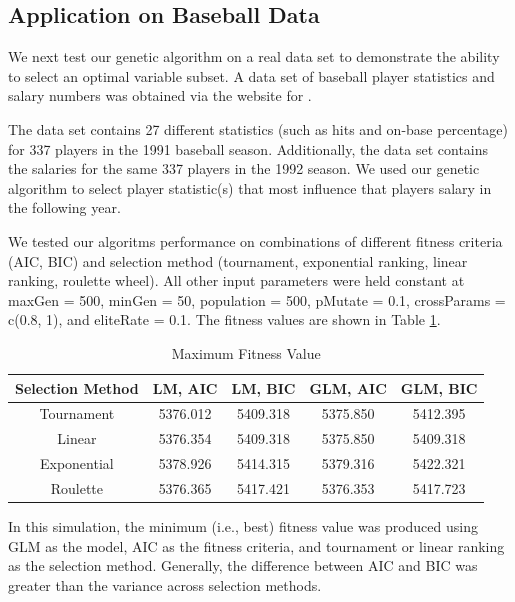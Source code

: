 \documentclass{article}
\begin{document}
\subsection{Application on Baseball Data}
We next test our genetic algorithm on a real data set to demonstrate the ability to select an optimal variable subset.  A data set of baseball player statistics and salary numbers was obtained via the website for \citet{compute}.

The data set contains 27 different statistics (such as hits and on-base percentage) for 337 players in the 1991 baseball season.  Additionally, the data set contains the salaries for the same 337 players in the 1992 season.  We used our genetic algorithm to select player statistic(s) that most influence that players salary in the following year.

We tested our algoritms performance on combinations of different fitness criteria (AIC, BIC) and selection method (tournament, exponential ranking, linear ranking, roulette wheel).  All other input parameters were held constant at maxGen = 500, minGen = 50, population = 500, pMutate = 0.1, crossParams = c(0.8, 1), and  eliteRate = 0.1.  The fitness values are shown in Table \ref{table:7}.

\begin{table}[htp]
    \centering
    \caption{Maximum Fitness Value}

\begin{tabular}{ |c|c|c|c|c|  }

 \hline
 Selection Method & LM, AIC & LM, BIC & GLM, AIC & GLM, BIC\\
 \hline
 Tournament &  5376.012   & 5409.318 & 5375.850  & 5412.395\\
 Linear & 5376.354 & 5409.318  & 5375.850 & 5409.318\\
 Exponential & 5378.926 & 5414.315 & 5379.316 & 5422.321\\
 Roulette   & 5376.365 & 5417.421 & 5376.353 & 5417.723\\
 \hline
\end{tabular}
    \label{table:7}
\end{table}

\vspace{5cm}

In this simulation, the minimum (i.e., best) fitness value was produced using GLM as the model, AIC as the fitness criteria, and tournament or linear ranking as the selection method.  Generally, the difference between AIC and BIC was greater than the variance across selection methods.
\end{document}

